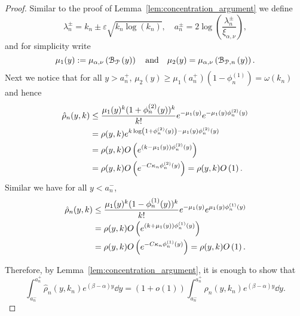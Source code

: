 \begin{proof}
Similar to the proof of Lemma~\ref{lem:concentration_argument} we define 
\[
	\lambda_n^\pm = k_n \pm \varepsilon \sqrt{k_n \log(k_n)}, \quad a_n^\pm = 2 \log\left(\frac{\lambda_n^\pm}{\xi_{\alpha,\nu}}\right),
\] 
and for simplicity write
\[
	\mu_1(y) := \mu_{\alpha,\nu}\left({\mathcal B}_{{\mathcal P}}\left(y\right)\right) \quad \text{and} \quad 
	\mu_2(y) = \mu_{\alpha,\nu}\left({\mathcal B}_{{\mathcal P},n}\left(y\right)\right).
\]
Next we notice that for all $y > a_n^+$, $\mu_2(y) \ge \mu_1(a_n^+)(1 - \phi_n^{(1)}) = \omega(k_n)$ and hence
\begin{align*}
	\hat{\rho}_n(y,k) &\le \frac{\mu_1(y)^k(1 + \phi_n^{(2)}(y))^k}{k!} e^{-\mu_1(y)} e^{-\mu_1(y)\phi_n^{(2)}(y)}  \\
	&= \rho(y,k) e^{k \log\left(1 +  \phi_n^{(2)}(y)\right) - \mu_1(y) \phi_n^{(2)}(y)}\\
	&= \rho(y,k) O\left(e^{(k - \mu_1(y))\phi_n^{(2)}(y)}\right)\\
	&= \rho(y,k) O\left(e^{-C \kappa_n \phi_n^{(2)}(y)}\right) = \rho(y,k) O\left(1\right).
\end{align*}
Similar we have for all $y < a_n^-$,
\begin{align*}
	\hat{\rho}_n(y,k) &\le \frac{\mu_1(y)^k(1 - \phi_n^{(1)}(y))^k}{k!} e^{-\mu_1(y)} e^{\mu_1(y)\phi_n^{(1)}(y)}\\
	&= \rho(y,k) O\left(e^{(k + \mu_1(y))\phi_n^{(1)}(y)}\right) \\
	&= \rho(y,k) O\left(e^{-C \kappa_n \phi_n^{(1)}(y)}\right) = \rho(y,k) O\left(1\right).
\end{align*}

Therefore, by Lemma~\ref{lem:concentration_argument}, it is enough to show that
\[
	\int_{a_n^-}^{a_n^+} \hat{\rho}_n(y,k_n) e^{(\beta - \alpha) y} \dd y = (1+o(1))\int_{a_n^-}^{a_n^+} \rho_n(y,k_n) e^{(\beta - \alpha) y} \dd y.
\]


\end{proof}
